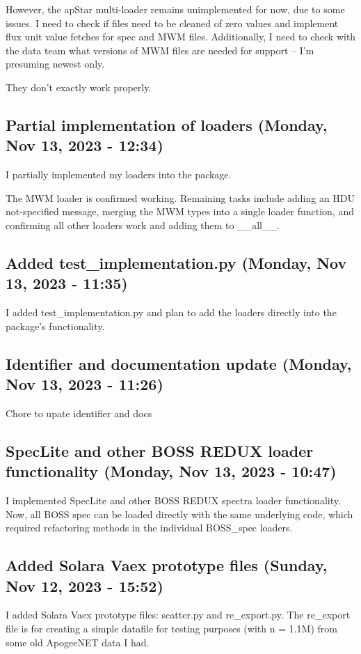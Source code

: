 \documentclass[a4paper]{article}
\begin{document}
However, the apStar multi-loader remains unimplemented for now, due to some issues. I need to check if files need to be cleaned of zero values and implement flux unit value fetches for spec and MWM files. Additionally, I need to check with the data team what versions of MWM files are needed for support -- I'm presuming newest only.

They don't exactly work properly.

\subsection*{Partial implementation of loaders (Monday, Nov 13, 2023 - 12:34)}
I partially implemented my loaders into the package.

The MWM loader is confirmed working. Remaining tasks include adding an HDU not-specified message, merging the MWM types into a single loader function, and confirming all other loaders work and adding them to \_\_all\_\_.

\subsection*{Added test\_implementation.py (Monday, Nov 13, 2023 - 11:35)}
I added test\_implementation.py and plan to add the loaders directly into the package's functionality.

\subsection*{Identifier and documentation update (Monday, Nov 13, 2023 - 11:26)}
Chore to upate identifier and docs

\subsection*{SpecLite and other BOSS REDUX loader functionality (Monday, Nov 13, 2023 - 10:47)}
I implemented SpecLite and other BOSS REDUX spectra loader functionality. Now, all BOSS spec can be loaded directly with the same underlying code, which required refactoring methods in the individual BOSS\_spec loaders.

\subsection*{Added Solara Vaex prototype files (Sunday, Nov 12, 2023 - 15:52)}
I added Solara Vaex prototype files: scatter.py and re\_export.py. The re\_export file is for creating a simple datafile for testing purposes (with n = 1.1M) from some old ApogeeNET data I had.
\end{document}
